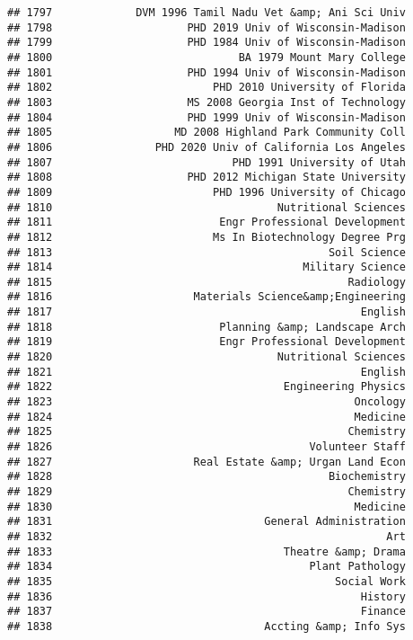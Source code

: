 \documentclass[
]{article}
\begin{document}
\begin{verbatim}
## 1797             DVM 1996 Tamil Nadu Vet &amp; Ani Sci Univ
## 1798                     PHD 2019 Univ of Wisconsin-Madison
## 1799                     PHD 1984 Univ of Wisconsin-Madison
## 1800                             BA 1979 Mount Mary College
## 1801                     PHD 1994 Univ of Wisconsin-Madison
## 1802                         PHD 2010 University of Florida
## 1803                     MS 2008 Georgia Inst of Technology
## 1804                     PHD 1999 Univ of Wisconsin-Madison
## 1805                   MD 2008 Highland Park Community Coll
## 1806                PHD 2020 Univ of California Los Angeles
## 1807                            PHD 1991 University of Utah
## 1808                     PHD 2012 Michigan State University
## 1809                         PHD 1996 University of Chicago
## 1810                                   Nutritional Sciences
## 1811                          Engr Professional Development
## 1812                         Ms In Biotechnology Degree Prg
## 1813                                           Soil Science
## 1814                                       Military Science
## 1815                                              Radiology
## 1816                      Materials Science&amp;Engineering
## 1817                                                English
## 1818                          Planning &amp; Landscape Arch
## 1819                          Engr Professional Development
## 1820                                   Nutritional Sciences
## 1821                                                English
## 1822                                    Engineering Physics
## 1823                                               Oncology
## 1824                                               Medicine
## 1825                                              Chemistry
## 1826                                        Volunteer Staff
## 1827                      Real Estate &amp; Urgan Land Econ
## 1828                                           Biochemistry
## 1829                                              Chemistry
## 1830                                               Medicine
## 1831                                 General Administration
## 1832                                                    Art
## 1833                                    Theatre &amp; Drama
## 1834                                        Plant Pathology
## 1835                                            Social Work
## 1836                                                History
## 1837                                                Finance
## 1838                                 Accting &amp; Info Sys

\end{verbatim}
\end{document}
